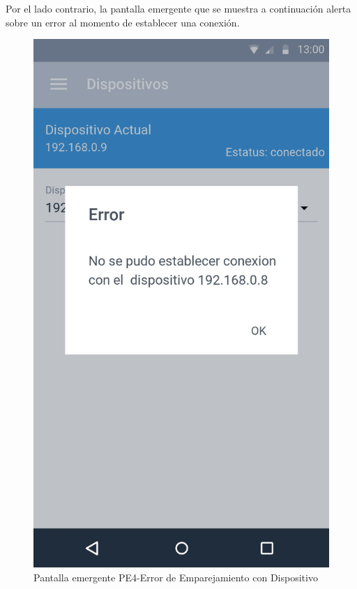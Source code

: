 Por el lado contrario, la pantalla emergente que se muestra a continuación alerta sobre un error al momento de establecer una conexión.

\begin{figure}[H]
	\centering
	\includegraphics[scale=0.70]{Capitulo4/software/submodulos/images/error_disp.png}
	\caption{Pantalla emergente PE4-Error de Emparejamiento con Dispositivo}
	\label{fig:Error Emparejamiento}
\end{figure}

